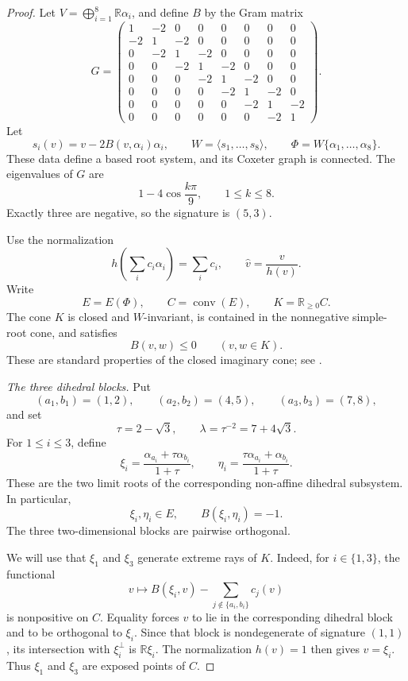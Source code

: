 \documentclass[11pt,reqno]{amsart}
\theoremstyle{plain}
\theoremstyle{definition}
\theoremstyle{remark}
\numberwithin{equation}{section}
\begin{document}
\begin{proof}
Let $V=\bigoplus_{i=1}^{8}\mathbb R\alpha_i$,
and define $B$ by the Gram matrix
\[
G=
\begin{pmatrix}
1&-2&0&0&0&0&0&0\\
-2&1&-2&0&0&0&0&0\\
0&-2&1&-2&0&0&0&0\\
0&0&-2&1&-2&0&0&0\\
0&0&0&-2&1&-2&0&0\\
0&0&0&0&-2&1&-2&0\\
0&0&0&0&0&-2&1&-2\\
0&0&0&0&0&0&-2&1
\end{pmatrix}.
\]
Let
\[
s_i(v)=v-2B(v,\alpha_i)\alpha_i,
\qquad
W=\langle s_1,\ldots,s_8\rangle,
\qquad
\Phi=W\{\alpha_1,\ldots,\alpha_8\}.
\]
These data define a based root system, and its Coxeter graph
is connected.
The eigenvalues of $G$ are
\[
1-4\cos\frac{k\pi}{9},
\qquad 1\le k\le8.
\]
Exactly three are negative, so the signature is $(5,3)$.

Use the normalization
\[
h\left(\sum_i c_i\alpha_i\right)=\sum_i c_i,
\qquad
\widehat v=\frac{v}{h(v)}.
\]
Write
\[
E=E(\Phi),
\qquad
C=\operatorname{conv}(E),
\qquad
K=\mathbb R_{\ge0}C.
\]
The cone $K$ is closed and $W$-invariant, is contained in the
nonnegative simple-root cone, and satisfies
\[
B(v,w)\le0
\qquad(v,w\in K).
\]
These are standard properties of the closed imaginary cone;
see \cite[Section~2]{DHR}.

\medskip
\noindent\textit{The three dihedral blocks.}
Put
\[
(a_1,b_1)=(1,2),
\qquad
(a_2,b_2)=(4,5),
\qquad
(a_3,b_3)=(7,8),
\]
and set
\[
\tau=2-\sqrt3,
\qquad
\lambda=\tau^{-2}=7+4\sqrt3.
\]
For $1\le i\le3$, define
\[
\xi_i=
\frac{\alpha_{a_i}+\tau\alpha_{b_i}}{1+\tau},
\qquad
\eta_i=
\frac{\tau\alpha_{a_i}+\alpha_{b_i}}{1+\tau}.
\]
These are the two limit roots of the corresponding non-affine
dihedral subsystem. In particular,
\[
\xi_i,\eta_i\in E,
\qquad
B(\xi_i,\eta_i)=-1.
\]
The three two-dimensional blocks are pairwise orthogonal.

We will use that $\xi_1$ and $\xi_3$ generate extreme rays of $K$.
Indeed, for $i\in\{1,3\}$, the functional
\[
v\longmapsto
B(\xi_i,v)-\sum_{j\notin\{a_i,b_i\}}c_j(v)
\]
is nonpositive on $C$.
Equality forces $v$ to lie in the corresponding dihedral block
and to be orthogonal to $\xi_i$.
Since that block is nondegenerate of signature $(1,1)$,
its intersection with $\xi_i^\perp$ is $\mathbb R\xi_i$.
The normalization $h(v)=1$ then gives $v=\xi_i$.
Thus $\xi_1$ and $\xi_3$ are exposed points of $C$.


\end{proof}
\end{document}
